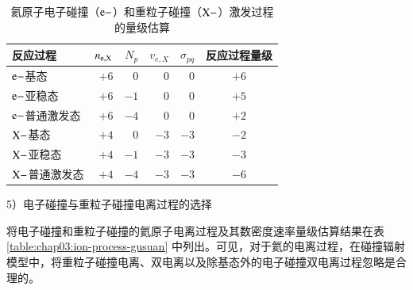 \begin{table}%
\caption{氦原子电子碰撞（${\rm e-}$）和重粒子碰撞（${\rm X-}$）激发过程的量级估算}
\label{table:chap03:exc-process-gusuan}
\begin{center}
\begin{tabular}{lrrrrc}\toprule[1.5pt]
反应过程 & $n_{\rm e,X}$ & $N_{p}$ & $v_{e,X}$ & $\sigma_{pq}$ & 反应过程量级\\
\midrule[1pt]
${\rm e-}$基态       & $+6$ & $0$  & $0$  & $0$  & $+6$ \\
${\rm e-}$亚稳态     & $+6$ & $-1$ & $0$  & $0$  & $+5$ \\
${\rm e-}$普通激发态 & $+6$ & $-4$ & $0$  & $0$  & $+2$ \\
${\rm X-}$基态       & $+4$ & $0$  & $-3$ & $-3$ & $-2$ \\
${\rm X-}$亚稳态     & $+4$ & $-1$ & $-3$ & $-3$ & $-3$ \\
${\rm X-}$普通激发态 & $+4$ & $-4$ & $-3$ & $-3$ & $-6$ \\
\bottomrule[1.5pt]
\end{tabular}
\end{center}
\end{table}

5）电子碰撞与重粒子碰撞电离过程的选择

将电子碰撞和重粒子碰撞的氦原子电离过程及其数密度速率量级估算结果在表 \ref{table:chap03:ion-process-gusuan} 中列出。可见，对于氦的电离过程，在碰撞辐射模型中，将重粒子碰撞电离、双电离以及除基态外的电子碰撞双电离过程忽略是合理的。

